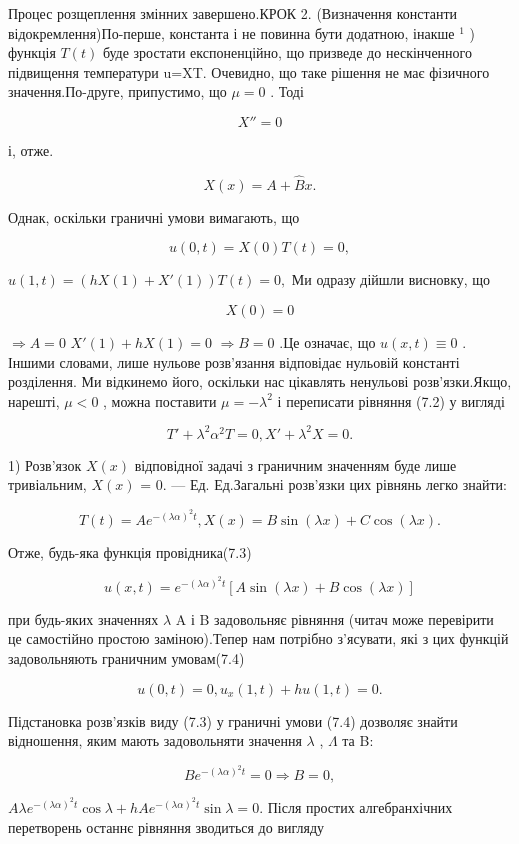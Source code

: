 \documentclass[
  ukrainian,
]{article}
\begin{document}
Процес розщеплення змінних завершено.КРОК 2. (Визначення константи
відокремлення)По-перше, константа і не повинна бути додатною, інакше
\(^{1}\) ) функція \(T\left( t\right)\) буде зростати експоненційно, що
призведе до нескінченного підвищення температури u=XT. Очевидно, що таке
рішення не має фізичного значення.По-друге, припустимо, що \(\mu = 0\) .
Тоді

\[
X'' = 0
\]

і, отже.

\[
X(x) = A + \hat{B}x.
\]

Однак, оскільки граничні умови вимагають, що

\[
u(0, t) = X(0) T(t) = 0,
\]

\(u(1, t) = (hX(1) + X'(1)) T(t) = 0,\) Ми одразу дійшли висновку, що

\[
X(0) = 0
\]

\(\Rightarrow A = 0\) \(X'(1) + hX(1) = 0\) \(\Rightarrow B = 0\) .Це
означає, що \(u(x, t) \equiv 0\) . Іншими словами, лише нульове
розв'язання відповідає нульовій константі розділення. Ми відкинемо його,
оскільки нас цікавлять ненульові розв'язки.Якщо, нарешті, \(\mu < 0\) ,
можна поставити \(\mu = -\lambda^2\) і переписати рівняння (7.2) у
вигляді

\[
T' + \lambda^2 \alpha^2 T = 0,
X' + \lambda^2 X = 0.
\]

1) Розв'язок \(X(x)\) відповідної задачі з граничним значенням буде лише
тривіальним, \(X(x)\) = 0. --- Ед. Ед.Загальні розв'язки цих рівнянь
легко знайти:

\[
T(t) = Ae^{-(\lambda \alpha)^2 t},
X(x) = B\sin(\lambda x) + C\cos(\lambda x).
\]

Отже, будь-яка функція провідника(7.3)

\[
u(x, t) = e^{-(\lambda \alpha)^2 t} [A \sin(\lambda x) + B \cos(\lambda x)]
\]

при будь-яких значеннях \(\lambda\) A і B задовольняє рівняння (читач
може перевірити це самостійно простою заміною).Тепер нам потрібно
з'ясувати, які з цих функцій задовольняють граничним умовам(7.4)

\[
u(0, t) = 0, u_x(1, t) + hu(1, t) = 0.
\]

Підстановка розв'язків виду (7.3) у граничні умови (7.4) дозволяє знайти
відношення, яким мають задовольняти значення \(\lambda\) , \(\Lambda\)
та B:

\[
Be^{-(\lambda\alpha)^2 t} = 0 \Rightarrow B = 0,
\]

\(A\lambda e^{-(\lambda\alpha)^2 t} \cos \lambda + hAe^{-(\lambda\alpha)^2 t} \sin \lambda = 0.\)
Після простих алгебранхічних перетворень останнє рівняння зводиться до
вигляду
\end{document}
